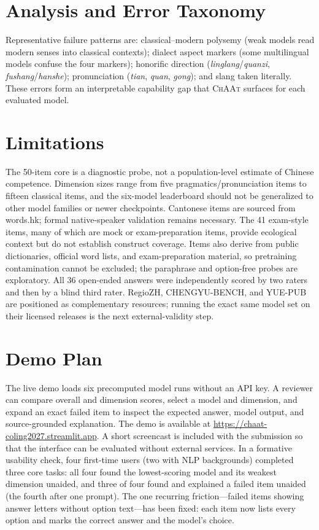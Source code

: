 \documentclass[11pt]{article}
\begin{document}
\section{Analysis and Error Taxonomy}

Representative failure patterns are: classical--modern polysemy (weak models read modern senses into classical contexts); dialect aspect markers (some multilingual models confuse the four markers); honorific direction (\textit{linglang}/\textit{quanzi}, \textit{fushang}/\textit{hanshe}); pronunciation (\textit{tian}, \textit{quan}, \textit{gong}); and slang taken literally. These errors form an interpretable capability gap that \textsc{ChAAt} surfaces for each evaluated model.

\section{Limitations}

The 50-item core is a diagnostic probe, not a population-level estimate of Chinese competence. Dimension sizes range from five pragmatics/pronunciation items to fifteen classical items, and the six-model leaderboard should not be generalized to other model families or newer checkpoints. Cantonese items are sourced from words.hk; formal native-speaker validation remains necessary. The 41 exam-style items, many of which are mock or exam-preparation items, provide ecological context but do not establish construct coverage. Items also derive from public dictionaries, official word lists, and exam-preparation material, so pretraining contamination cannot be excluded; the paraphrase and option-free probes are exploratory. All 36 open-ended answers were independently scored by two raters and then by a blind third rater. RegioZH, CHENGYU-BENCH, and YUE-PUB are positioned as complementary resources; running the exact same model set on their licensed releases is the next external-validity step.

\section{Demo Plan}

The live demo loads six precomputed model runs without an API key. A reviewer can compare overall and dimension scores, select a model and dimension, and expand an exact failed item to inspect the expected answer, model output, and source-grounded explanation. The demo is available at \url{https://chaat-coling2027.streamlit.app}. A short screencast is included with the submission so that the interface can be evaluated without external services. In a formative usability check, four first-time users (two with NLP backgrounds) completed three core tasks: all four found the lowest-scoring model and its weakest dimension unaided, and three of four found and explained a failed item unaided (the fourth after one prompt). The one recurring friction---failed items showing answer letters without option text---has been fixed: each item now lists every option and marks the correct answer and the model's choice.
\end{document}

